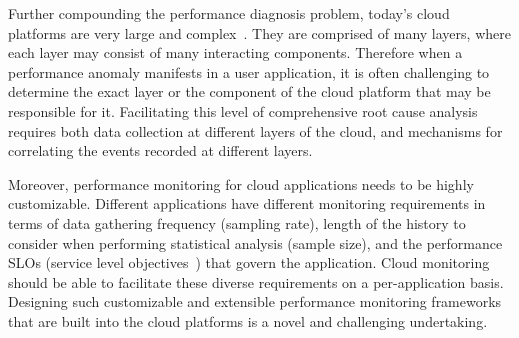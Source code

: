 %

Further compounding the performance
diagnosis problem, today's cloud platforms are very 
large and complex~\cite{DaCunhaRodrigues:2016:MCC:2851613.2851619,Ibidunmoye:2015:PAD:2808687.2791120}. 
They are
comprised of many layers, where each layer may consist of many interacting components.
Therefore when a performance anomaly manifests in a user application, it is
often challenging
to determine the exact layer or the component of the cloud platform that may be responsible for it. 
Facilitating this level of comprehensive root cause analysis requires
both data collection at different layers of the cloud, and mechanisms for correlating 
the events recorded at different layers. 
%
%

Moreover, performance monitoring for cloud applications needs to be highly customizable. Different
applications have different monitoring requirements in terms of data gathering frequency (sampling rate), 
length of the history to consider when performing statistical analysis (sample size), and the performance 
SLOs (service level objectives~\cite{XXX}) that govern the application.
Cloud monitoring should be able to facilitate these diverse requirements on a
per-application basis.
Designing such customizable and extensible performance
monitoring frameworks that are built into the cloud platforms is a novel and challenging undertaking.

